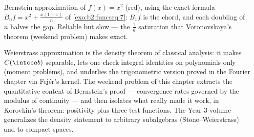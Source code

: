 \begin{omfigure}

{\small Bernstein approximation of $f(x) = x^2$ (red), using
the exact formula $B_nf = x^2 + \frac{x(1-x)}{n}$ of
\cref{exo:b2:funcseq:7}: $B_1f$ is the chord, and each doubling
of $n$ halves the gap. Reliable but slow --- the $\frac1n$
saturation that Voronovskaya's theorem (weekend problem) makes
exact.}
\end{omfigure}

\begin{remark}
Weierstrass approximation is the density theorem of classical
analysis: it makes $C(\intcc ab)$ separable, lets one check
integral identities on polynomials only (moment problems), and
underlies the trigonometric version proved in the Fourier
chapter via Fej\'er's kernel. The weekend problem of this
chapter extracts the quantitative content of Bernstein's proof
--- convergence rates governed by the modulus of continuity ---
and then isolates what really made it work, in Korovkin's
theorem: positivity plus three test functions. The Year 3
volume generalizes the density statement to arbitrary
subalgebras (Stone--Weierstrass) and to compact spaces.
\end{remark}

